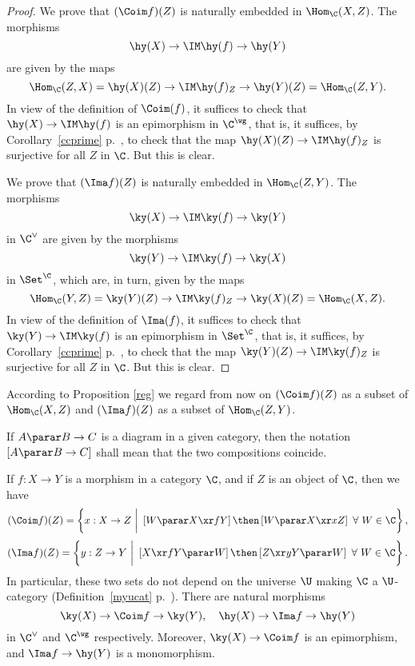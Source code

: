 \documentclass[12pt]{article}
\theoremstyle{remark}
\theoremstyle{definition}
\begin{document}
\begin{proof}
We prove that $(\Coim f)(Z)$ is naturally embedded in $\Hom_\C(X,Z)$. The morphisms 
$$
\hy(X)\to\IM \hy(f)\to\hy(Y)
$$ 
are given by the maps 
$$
\Hom_\C(Z,X)=\hy(X)(Z)\to\IM\hy(f)_Z\to\hy(Y)(Z)=\Hom_\C(Z,Y).
$$ 
In view of the definition of $\Coim(f)$, it suffices to check that $\hy(X)\to\IM\hy(f)$ is an epimorphism in $\C^\wg$, that is, it suffices, by Corollary~\ref{ccprime} p.~, to check that the map $\hy(X)(Z)\to\IM\hy(f)_Z$ is surjective for all $Z$ in $\C$. But this is clear. 

We prove that $(\Ima f)(Z)$ is naturally embedded in $\Hom_\C(Z,Y)$. The morphisms 
$$
\ky(X)\to\IM\ky(f)\to\ky(Y)
$$ 
in $\C^\vee$ are given by the morphisms 
$$
\ky(Y)\to\IM\ky(f)\to\ky(X)
$$ 
in $\Set^\C$, which are, in turn, given by the maps 
$$
\Hom_\C(Y,Z)=\ky(Y)(Z)\to\IM\ky(f)_Z\to\ky(X)(Z)=\Hom_\C(X,Z).
$$ 
In view of the definition of $\Ima(f)$, it suffices to check that $\ky(Y)\to\IM\ky(f)$ is an epimorphism in $\Set^\C$, that is, it suffices, by Corollary~\ref{ccprime} p.~, to check that the map $\ky(Y)(Z)\to\IM\ky(f)_Z$ is surjective for all $Z$ in $\C$. But this is clear. 
\end{proof} 

According to Proposition \ref{reg} we regard from now on $(\Coim f)(Z)$ as a subset of $\Hom_\C(X,Z)$ and $(\Ima f)(Z)$ as a subset of $\Hom_\C(Z,Y)$.\bigskip

\begin{conv}
If $A\parar B\to C$ is a diagram in a given category, then the notation $[A\parar B\to C]$ shall mean that the two compositions coincide.
\end{conv}\bigskip

\begin{prop}
If $f:X\to Y$ is a morphism in a category $\C$, and if $Z$ is an object of $\C$, then we have 
$$
(\Coim f)(Z)=\left\{x:X\to Z\ \bigg|\ \left[W\parar X\xr fY\right]\then\left[W\parar X\xr xZ\right]\ \forall\ W\in\C\right\},
$$
$$
(\Ima f)(Z)=\left\{y:Z\to Y\ \bigg|\ \left[X\xr fY\parar W\right]\then\left[Z\xr yY\parar W\right]\ \forall\ W\in\C\right\}.
$$ 
In particular, these two sets do not depend on the universe $\U$ making $\C$ a $\U$\--category (Definition~\ref{myucat} p.~). There are natural morphisms 
$$
\ky(X)\to\Coim f\to\ky(Y),\quad\hy(X)\to\Ima f\to\hy(Y)
$$ 
in $\C^\vee$ and $\C^\wg$ respectively. Moreover, $\ky(X)\to\Coim f$ is an epimorphism, and $\Ima f\to\hy(Y)$ is a monomorphism. 
\end{prop} 
\end{document}
